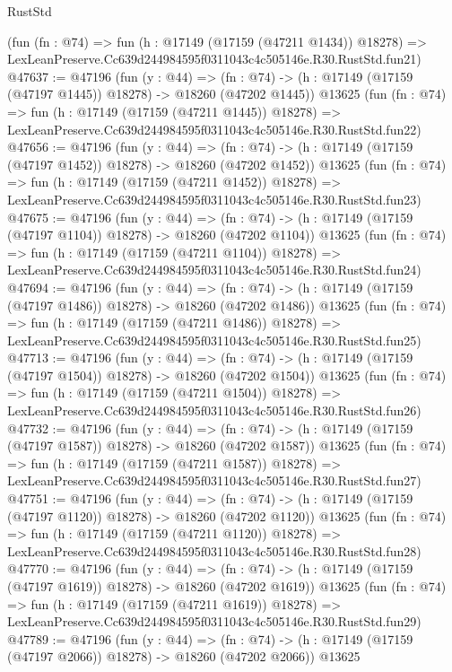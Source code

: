 \begin{lexlean}{RustStd}
\begin{coremodule}
    (fun (fn : @74) =>
    fun (h : @17149 (@17159 (@47211 @1434)) @18278) =>
    LexLeanPreserve.Cc639d244984595f0311043c4c505146e.R30.RustStd.fun21)
@47637 := @47196
    (fun (y : @44) =>
    (fn : @74) -> (h : @17149 (@17159 (@47197 @1445)) @18278) -> @18260 (@47202 @1445))
    @13625
    (fun (fn : @74) =>
    fun (h : @17149 (@17159 (@47211 @1445)) @18278) =>
    LexLeanPreserve.Cc639d244984595f0311043c4c505146e.R30.RustStd.fun22)
@47656 := @47196
    (fun (y : @44) =>
    (fn : @74) -> (h : @17149 (@17159 (@47197 @1452)) @18278) -> @18260 (@47202 @1452))
    @13625
    (fun (fn : @74) =>
    fun (h : @17149 (@17159 (@47211 @1452)) @18278) =>
    LexLeanPreserve.Cc639d244984595f0311043c4c505146e.R30.RustStd.fun23)
@47675 := @47196
    (fun (y : @44) =>
    (fn : @74) -> (h : @17149 (@17159 (@47197 @1104)) @18278) -> @18260 (@47202 @1104))
    @13625
    (fun (fn : @74) =>
    fun (h : @17149 (@17159 (@47211 @1104)) @18278) =>
    LexLeanPreserve.Cc639d244984595f0311043c4c505146e.R30.RustStd.fun24)
@47694 := @47196
    (fun (y : @44) =>
    (fn : @74) -> (h : @17149 (@17159 (@47197 @1486)) @18278) -> @18260 (@47202 @1486))
    @13625
    (fun (fn : @74) =>
    fun (h : @17149 (@17159 (@47211 @1486)) @18278) =>
    LexLeanPreserve.Cc639d244984595f0311043c4c505146e.R30.RustStd.fun25)
@47713 := @47196
    (fun (y : @44) =>
    (fn : @74) -> (h : @17149 (@17159 (@47197 @1504)) @18278) -> @18260 (@47202 @1504))
    @13625
    (fun (fn : @74) =>
    fun (h : @17149 (@17159 (@47211 @1504)) @18278) =>
    LexLeanPreserve.Cc639d244984595f0311043c4c505146e.R30.RustStd.fun26)
@47732 := @47196
    (fun (y : @44) =>
    (fn : @74) -> (h : @17149 (@17159 (@47197 @1587)) @18278) -> @18260 (@47202 @1587))
    @13625
    (fun (fn : @74) =>
    fun (h : @17149 (@17159 (@47211 @1587)) @18278) =>
    LexLeanPreserve.Cc639d244984595f0311043c4c505146e.R30.RustStd.fun27)
@47751 := @47196
    (fun (y : @44) =>
    (fn : @74) -> (h : @17149 (@17159 (@47197 @1120)) @18278) -> @18260 (@47202 @1120))
    @13625
    (fun (fn : @74) =>
    fun (h : @17149 (@17159 (@47211 @1120)) @18278) =>
    LexLeanPreserve.Cc639d244984595f0311043c4c505146e.R30.RustStd.fun28)
@47770 := @47196
    (fun (y : @44) =>
    (fn : @74) -> (h : @17149 (@17159 (@47197 @1619)) @18278) -> @18260 (@47202 @1619))
    @13625
    (fun (fn : @74) =>
    fun (h : @17149 (@17159 (@47211 @1619)) @18278) =>
    LexLeanPreserve.Cc639d244984595f0311043c4c505146e.R30.RustStd.fun29)
@47789 := @47196
    (fun (y : @44) =>
    (fn : @74) -> (h : @17149 (@17159 (@47197 @2066)) @18278) -> @18260 (@47202 @2066))
    @13625

\end{coremodule}
\end{lexlean}
